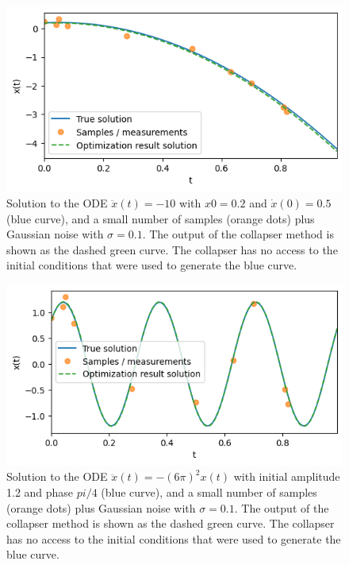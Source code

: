 \documentclass{article}
\begin{document}
\begin{figure}
\includegraphics{images/results/fit_const_acc.png}
\centering
\caption{
Solution to the ODE $\ddot{x}(t) = -10$ with $x{0} = 0.2$ and $\dot{x}(0) = 0.5$ (blue curve), and a small number of samples (orange dots) plus Gaussian noise with $\sigma = 0.1$.
The output of the collapser method is shown as the dashed green curve.
The collapser has no access to the initial conditions that were used to generate the blue curve.
}
\label{fig:fit_const_acc}
\end{figure}

\begin{figure}
\includegraphics{images/results/fit_sho.png}
\centering
\caption{
Solution to the ODE $\ddot{x}(t) = - (6\pi)^2 x(t)$ with initial amplitude 1.2 and phase $pi/4$ (blue curve), and a small number of samples (orange dots) plus Gaussian noise with $\sigma = 0.1$.
The output of the collapser method is shown as the dashed green curve.
The collapser has no access to the initial conditions that were used to generate the blue curve.
}
\label{fig:fit_sho}
\end{figure}
\end{document}
